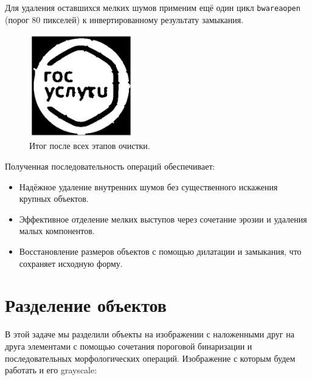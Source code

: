 \documentclass[a4paper,12pt]{article}
\begin{document}
Для удаления оставшихся мелких шумов применим ещё один цикл \texttt{bwareaopen} (порог 80 пикселей) к инвертированному результату замыкания.

\begin{figure}[H]
    \centering
    \includegraphics[width=0.4\textwidth]{result/1_beware_inside_2.png}
    \caption{Итог после всех этапов очистки.}
\end{figure}

Полученная последовательность операций обеспечивает:
\begin{itemize}
  \item Надёжное удаление внутренних шумов без существенного искажения крупных объектов.
  \item Эффективное отделение мелких выступов через сочетание эрозии и удаления малых компонентов.
  \item Восстановление размеров объектов с помощью дилатации и замыкания, что сохраняет исходную форму.
\end{itemize}

\section{Разделение объектов}
В этой задаче мы разделили объекты на изображении с наложенными друг на друга элементами с помощью сочетания пороговой бинаризации и последовательных морфологических операций. Изображение с которым будем работать и его grayscale:
\end{document}
